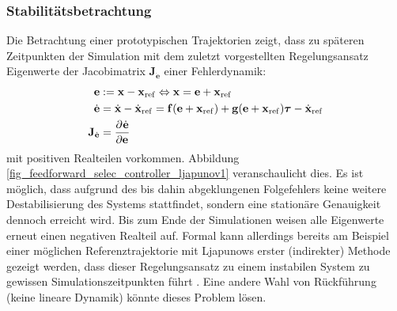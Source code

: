\subsubsection{Stabilitätsbetrachtung}
Die Betrachtung einer prototypischen Trajektorien zeigt, dass zu späteren Zeitpunkten der Simulation mit dem zuletzt vorgestellten Regelungsansatz Eigenwerte der Jacobimatrix $\mathbf{J}_{\dot{\mathbf{e}}}$ einer Fehlerdynamik:
\begin{align}
	\mathbf{e} &:= \mathbf{x} - \mathbf{x}_{\mathrm{ref}} \Leftrightarrow \mathbf{x} = \mathbf{e} + \mathbf{x}_{\mathrm{ref}} \\
	\dot{\mathbf{e}} &= \dot{\mathbf{x}} - \dot{\mathbf{x}}_{\mathrm{ref}} = \mathbf{f}(\mathbf{e} + \mathbf{x}_{\mathrm{ref}}) + \mathbf{g}(\mathbf{e} + \mathbf{x}_{\mathrm{ref}}) \boldsymbol{\tau} - \dot{\mathbf{x}}_{\mathrm{ref}} \\
	\mathbf{J}_{\dot{\mathbf{e}}} &= \frac{\partial^{}\dot{\mathbf{e}}}{\partial{\mathbf{e}}^{}}
\end{align}
mit positiven Realteilen vorkommen. Abbildung \ref{fig_feedforward_selec_controller_ljapunov1} veranschaulicht dies. Es ist möglich, dass aufgrund des bis dahin abgeklungenen Folgefehlers keine weitere Destabilisierung des Systems stattfindet, sondern eine stationäre Genauigkeit dennoch erreicht wird. Bis zum Ende der Simulationen weisen alle Eigenwerte erneut einen negativen Realteil auf. Formal kann allerdings bereits am Beispiel einer möglichen Referenztrajektorie mit Ljapunows erster (indirekter) Methode gezeigt werden, dass dieser Regelungsansatz zu einem instabilen System zu gewissen Simulationszeitpunkten führt \cite[Vorlesung 4]{NLRT_Winkler2020}. Eine andere Wahl von Rückführung (keine lineare Dynamik) könnte dieses Problem lösen.

